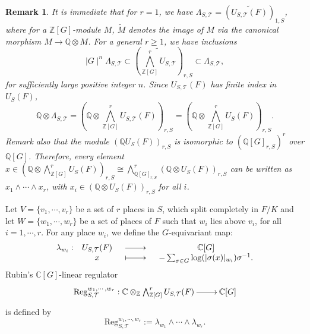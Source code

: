 \documentclass[reqno]{amsart}
\newcounter{dummy} \numberwithin{dummy}{section}
\newtheorem{rem}[dummy]{Remark}
\begin{document}
\begin{rem}\label{Remark Rubin lattice}
It is immediate that for $r=1$, we have
$\Lambda_{S,\mathcal{T}}=(\widetilde{U_{S,\mathcal{T}}(F)})_{1,S}$,
where for a $\mathbb{Z}[G]$-module $M$, $\widetilde{M}$ denotes the
image of $M$ via the canonical morphism $M\longrightarrow
\mathbb{Q}\otimes M$. For a general $r\geq 1$, we have inclusions
$$
\mid G\mid^{n}\Lambda_{S,\mathcal{T}}\subset
(\widetilde{\bigwedge^{r}_{\mathbb{Z}[G]}U_{S,\mathcal{T}}})_{r,S}\subset
\Lambda_{S,\mathcal{T}},
$$
for sufficiently large positive integer $n$. Since
$U_{S,\mathcal{T}}(F)$ has finite index in $U_{S}(F)$,
$$
\mathbb{Q}\otimes \Lambda_{S,\mathcal{T}}= (\mathbb{Q}\otimes
\bigwedge^{r}_{\mathbb{Z}[G]}U_{S,\mathcal{T}}(F))_{r,S}=(\mathbb{Q}\otimes
\bigwedge^{r}_{\mathbb{Z}[G]}U_{S}(F))_{r,S}.
$$
Remark also that the module  $(\mathbb{Q}U_{S}(F))_{r,S}$ is
isomorphic to $(\mathbb{Q}[G]_{r,S})^{r}$ over $\mathbb{Q}[G]$.
Therefore, every element $x\in (\mathbb{Q}\otimes
\bigwedge^{r}_{\mathbb{Z}[G]}U_{S}(F))_{r,S}\cong
\bigwedge^{r}_{\mathbb{Q}[G]_{r,S}}(\mathbb{Q}\otimes
U_{S}(F))_{r,S}$ can be written as $x_{1}\wedge\cdots\wedge x_{r}$,
with $x_{i}\in (\mathbb{Q}\otimes U_{S}(F))_{r,S}$ for all $i$.
\end{rem}
 Let $V=\{v_{1},\cdots, v_{r}\}$ be a set of $r$ places
in $S$, which split completely in $F/K$ and let
$W=\{w_{1},\cdots,w_{r}\}$ be a set of places of $F$ such that
$w_{i}$ lies  above  $v_{i}$, for all $i=1,\cdots, r$. For any place
$w_{i}$, we define the  $G$-equivariant map:
$$
\begin{array}{cccc}
  \lambda_{w_{i}}:& U_{S,\mathcal{T}}(F) & \xymatrix@=2pc{\ar[r]&} & \mathbb{C}[G] \\
 &x & \xymatrix@=2pc{\ar@{|->}[r]&} & -\sum_{\sigma\in
  G}\log(|\sigma(x)|_{w_{i}})\sigma^{-1}.
\end{array}
$$
Rubin's $\mathbb{C}[G]$-linear regulator
$$
\xymatrix@=2pc{\mathrm{Reg}_{S,\mathcal{T}}^{w_{1},\cdots,w_{r}}:
\mathbb{C}\otimes_{\mathbb{Z}}\bigwedge^{r}_{\mathbb{Z}[G]}U_{S,\mathcal{T}}(F)\ar[r]&
\mathbb{C}[G]}
$$
is defined by
$$
\mathrm{Reg}_{S,\mathcal{T}}^{w_{1},\cdots,w_{r}}:=\lambda_{w_{1}}\wedge\cdots\wedge\lambda_{w_{r}}.
$$
\end{document}
